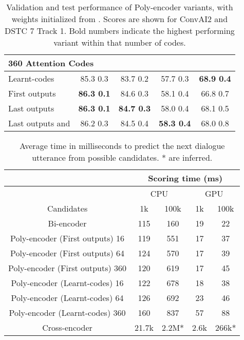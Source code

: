 \documentclass{article} \usepackage{iclr2020_conference,times}
\begin{document}
\begin{table*}[h]
\begin{tabular}{|l|c|c|c|c|}
\hline
 \multicolumn{5}{|l|}{\textbf{360 Attention Codes}}  \\
\hline		
Learnt-codes &	85.3  0.3 &	83.7  0.2 & 57.7  0.3 & 	\textbf{68.9  0.4} \\
First  outputs &	\textbf{86.3  0.1} &	84.6  0.3 & 58.1  0.4 & 	66.8  0.7 \\
Last  outputs &	\textbf{86.3  0.1} &	\textbf{84.7  0.3}  & 58.0  0.4 & 	68.1  0.5\\
Last  outputs and  &	86.2  0.3 &	84.5  0.4 & \textbf{58.3  0.4 }& 	68.0  0.8 \\

\hline
\end{tabular}
\caption{Validation and test performance of Poly-encoder variants, with weights initialized from \citep{devlin-etal-2019-bert}. Scores are shown for ConvAI2 and  DSTC 7 Track 1. Bold numbers indicate the highest performing variant within that number of codes.
\label{table:all_poly_types}
}


\end{table*}



\begin{table*}
\center
\begin{small}
\begin{tabular}{|c|c|c|c|c|}
\hline
 & \multicolumn{4}{c|}{Scoring time (ms)}\\
\hline
 & \multicolumn{2}{c|}{CPU} & \multicolumn{2}{c|}{GPU}\\
\hline
Candidates & 1k  & 100k& 1k  & 100k \\
\hline
\hline
Bi-encoder & 115 & 160 & 19 & 22\\
\hline
Poly-encoder (First  outputs) 16 & 119 & 551 & 17 & 37 \\
\hline
Poly-encoder (First  outputs) 64 & 124 & 570 & 17 & 39 \\
\hline
Poly-encoder (First  outputs) 360 & 120 & 619 & 17 &  45\\
\hline
Poly-encoder (Learnt-codes) 16 & 122 & 678 & 18 & 38 \\
\hline
Poly-encoder (Learnt-codes) 64 & 126 & 692 & 23 & 46 \\
\hline
Poly-encoder (Learnt-codes) 360 & 160 & 837 & 57 & 88 \\
\hline
Cross-encoder & 21.7k & 2.2M* & 2.6k & 266k*\\

\hline

\end{tabular}
\end{small}
\caption{Average time in milliseconds to predict the next dialogue utterance from  possible candidates. * are inferred.
\label{all_timing}
}

\end{table*}
\end{document}
